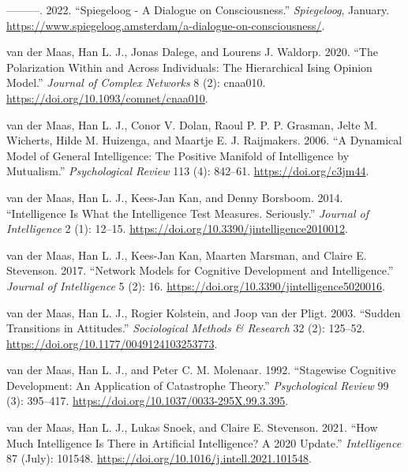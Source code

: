 \documentclass[
  a4paper,
  DIV=11,
  numbers=noendperiod,
  oneside]{scrreprt}
\newlength{\cslhangindent}
\newenvironment{CSLReferences}[2] %
 {\begin{list}{}{%
  \setlength{\itemindent}{0pt}
  \setlength{\leftmargin}{0pt}
  \setlength{\parsep}{0pt}
  \ifodd #1
   \setlength{\leftmargin}{\cslhangindent}
   \setlength{\itemindent}{-1\cslhangindent}
  \fi
  \setlength{\itemsep}{#2\baselineskip}}}
 {\end{list}}
\begin{document}
\begin{CSLReferences}{1}{0}
---------. 2022. {``Spiegeloog - A Dialogue on Consciousness.''}
\emph{Spiegeloog}, January.
\url{https://www.spiegeloog.amsterdam/a-dialogue-on-consciousness/}.

van der Maas, Han L. J., Jonas Dalege, and Lourens J. Waldorp. 2020.
{``The Polarization Within and Across Individuals: The Hierarchical
Ising Opinion Model.''} \emph{Journal of Complex Networks} 8 (2):
cnaa010. \url{https://doi.org/10.1093/comnet/cnaa010}.

van der Maas, Han L. J., Conor V. Dolan, Raoul P. P. P. Grasman, Jelte
M. Wicherts, Hilde M. Huizenga, and Maartje E. J. Raijmakers. 2006. {``A
Dynamical Model of General Intelligence: {The} Positive Manifold of
Intelligence by Mutualism.''} \emph{Psychological Review} 113 (4):
842--61. \url{https://doi.org/c3jm44}.

van der Maas, Han L. J., Kees-Jan Kan, and Denny Borsboom. 2014.
{``Intelligence Is What the Intelligence Test Measures. Seriously.''}
\emph{Journal of Intelligence} 2 (1): 12--15.
\url{https://doi.org/10.3390/jintelligence2010012}.

van der Maas, Han L. J., Kees-Jan Kan, Maarten Marsman, and Claire E.
Stevenson. 2017. {``Network {Models} for {Cognitive Development} and
{Intelligence}.''} \emph{Journal of Intelligence} 5 (2): 16.
\url{https://doi.org/10.3390/jintelligence5020016}.

van der Maas, Han L. J., Rogier Kolstein, and Joop van der Pligt. 2003.
{``Sudden {Transitions} in {Attitudes}.''} \emph{Sociological Methods \&
Research} 32 (2): 125--52.
\url{https://doi.org/10.1177/0049124103253773}.

van der Maas, Han L. J., and Peter C. M. Molenaar. 1992. {``Stagewise
Cognitive Development: An Application of Catastrophe Theory.''}
\emph{Psychological Review} 99 (3): 395--417.
\url{https://doi.org/10.1037/0033-295X.99.3.395}.

van der Maas, Han L. J., Lukas Snoek, and Claire E. Stevenson. 2021.
{``How Much Intelligence Is There in Artificial Intelligence? {A} 2020
Update.''} \emph{Intelligence} 87 (July): 101548.
\url{https://doi.org/10.1016/j.intell.2021.101548}.


\end{CSLReferences}
\end{document}
